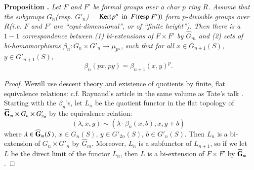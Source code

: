 \medskip
\noindent
{\bf Proposition .\label{art15-prop4}}
{\em Let $F$ and $F'$ be formal groups over a {\rm char} $p$ ring $R$. Assume that the subgroups $G_{n}$(resp. $G'_{n}$) = $\operatorname{\mathrm{Ker}} (p^{n}\text{~ in~ } F(\text{resp } F'))$ form $p$-divisible groups over $R$(i.e. $F$ and $F'$ are ``equi-dimensional'', or of ``finite height''). Then there is a $1-1$ correspondence between {\rm(1)} bi-extensions of $F\times F'$ by $\widehat{G}_{m}$ and {\rm(2)} sets of bi-homomorphisms $\beta_{n}:G_{n}\times G'_{n}\to \mu_{p^{n}}$, such that for all $x\in G_{n+1}(S)$, $y\in G'_{n+1}(S)$,}
$$
\beta_{n}(px,py)=\beta_{n+1}(x,y)^{p}.
$$

\begin{proof}
We\pageoriginale will use descent theory and existence of quotients by finite, flat equivalence relations: c.f. Raynaud's article in the same volume as Tate's talk \cite{art15-key6}. Starting with the $\beta_{n}$'s, let $L_{n}$ be the quotient functor in the flat topology of $\widehat{\mathbf{G}}_{m}\times G_{n}\times G'_{2n}$ by the equivalence relation:
$$
(\lambda,x,y)\sim (\lambda\cdot \beta_{n}(x,b),x,y+b)
$$
where $\lambda\in \widehat{\mathbf{G}}_{m}(S)$, $x\in G_{n}(S)$, $y\in G'_{2n}(S)$, $b\in G'_{n}(S)$. Then $L_{n}$ is a bi-extension of $G_{n}\times G'_{n}$ by $\widehat{G}_{m}$. Moreover, $L_{n}$ is a subfunctor of $L_{n+1}$, so if we let $L$ be the direct limit of the functor $L_{n}$, then $L$ is a bi-extension of $F\times F'$ by $\widehat{\mathbf{G}}_{m}$.


\end{proof}
